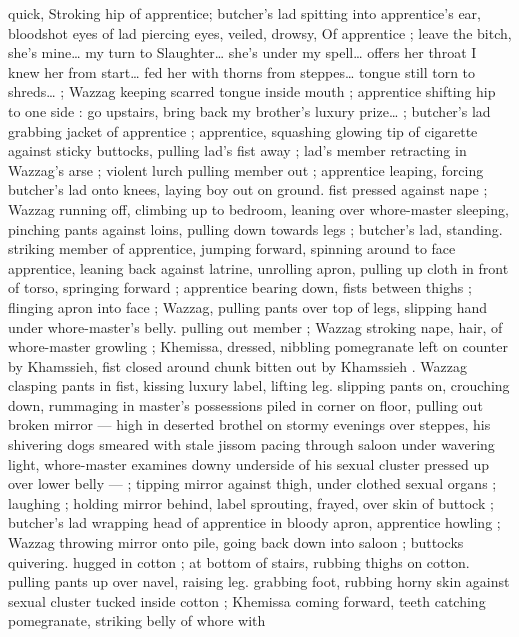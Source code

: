 quick, Stroking hip of apprentice; butcher's lad spitting into 
apprentice's ear, bloodshot eyes of lad piercing eyes, veiled, drowsy, 
Of apprentice ; {\gl}{\td} leave the bitch, she's mine{\ldots} my turn to 
Slaughter{\ldots} she's under my spell{\ldots} offers her throat{\td} I knew her from 
start{\ldots} fed her with thorns from steppes{\ldots} tongue still torn to 
shreds{\ldots}{\gr} ; Wazzag keeping scarred tongue inside mouth ; 
apprentice shifting hip to one side : {\gl} go upstairs, bring back my 
brother's luxury prize{\ldots}{\gr} ; butcher's lad grabbing jacket of 
apprentice ; apprentice, squashing glowing tip of cigarette against 
sticky buttocks, pulling lad's fist away ; lad's member retracting in 
Wazzag's arse ; violent lurch pulling member out ; apprentice 
leaping, forcing butcher's lad onto knees, laying boy out on ground. 
fist pressed against nape ; Wazzag running off, climbing up to 
bedroom, leaning over whore-master sleeping, pinching pants 
against loins, pulling down towards legs ; butcher's lad, standing. 
striking member of apprentice, jumping forward, spinning around to 
face apprentice, leaning back against latrine, unrolling apron, pulling 
up cloth in front of torso, springing forward ; apprentice bearing 
down, fists between thighs ; flinging apron into face ; Wazzag, pulling 
pants over top of legs, slipping hand under whore-master's belly. 
pulling out member ; Wazzag stroking nape, hair, of whore-master 
growling ; Khemissa, dressed, nibbling pomegranate left on counter 
by Khamssieh, fist closed around chunk bitten out by Khamssieh . 
Wazzag clasping pants in fist, kissing luxury label, lifting leg. slipping 
pants on, crouching down, rummaging in master's possessions piled 
in corner on floor, pulling out broken mirror --- high in deserted 
brothel on stormy evenings over steppes, his shivering dogs 
smeared with stale jissom pacing through saloon under wavering 
light, whore-master examines downy underside of his sexual cluster 
pressed up over lower belly --- ; tipping mirror against thigh, under 
clothed sexual organs ; laughing ; holding mirror behind, label 
sprouting, frayed, over skin of buttock ; butcher's lad wrapping head 
of apprentice in bloody apron, apprentice howling ; Wazzag throwing 
mirror onto pile, going back down into saloon ; buttocks quivering. 
hugged in cotton ; at bottom of stairs, rubbing thighs on cotton. 
pulling pants up over navel, raising leg. grabbing foot, rubbing horny 
skin against sexual cluster tucked inside cotton ; Khemissa coming 
forward, teeth catching pomegranate, striking belly of whore with 
